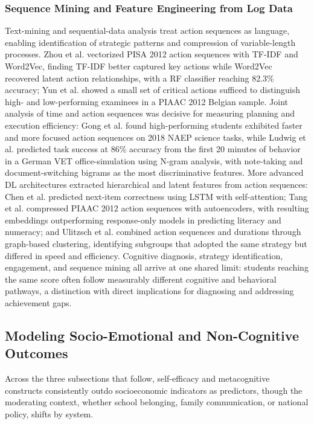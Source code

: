 \documentclass{ieeeaccess}
\begin{document}
\subsubsection{Sequence Mining and Feature Engineering from Log Data}\label{subsubsec4.2.4}

Text-mining and sequential-data analysis treat action sequences as language, enabling identification of strategic patterns and compression of variable-length processes. Zhou et al. \cite{zhou-etal2024} vectorized PISA 2012 action sequences with TF-IDF and Word2Vec, finding TF-IDF better captured key actions while Word2Vec recovered latent action relationships, with a RF classifier reaching 82.3\% accuracy; Yun et al. \cite{yun-etal2025} showed a small set of critical actions sufficed to distinguish high- and low-performing examinees in a PIAAC 2012 Belgian sample. Joint analysis of time and action sequences was decisive for measuring planning and execution efficiency: Gong et al. \cite{gong-etal2023} found high-performing students exhibited faster and more focused action sequences on 2018 NAEP science tasks, while Ludwig et al. \cite{ludwig-etal2024} predicted task success at 86\% accuracy from the first 20 minutes of behavior in a German VET office-simulation using N-gram analysis, with note-taking and document-switching bigrams as the most discriminative features. More advanced DL architectures extracted hierarchical and latent features from action sequences: Chen et al. \cite{chen-etal2023} predicted next-item correctness using LSTM with self-attention; Tang et al. \cite{tang-etal2021} compressed PIAAC 2012 action sequences with autoencoders, with resulting embeddings outperforming response-only models in predicting literacy and numeracy; and Ulitzsch et al. \cite{ulitzsch-etal2021} combined action sequences and durations through graph-based clustering, identifying subgroups that adopted the same strategy but differed in speed and efficiency. Cognitive diagnosis, strategy identification, engagement, and sequence mining all arrive at one shared limit: students reaching the same score often follow measurably different cognitive and behavioral pathways, a distinction with direct implications for diagnosing and addressing achievement gaps.

\subsection{Modeling Socio-Emotional and Non-Cognitive Outcomes}\label{subsec4.3}

Across the three subsections that follow, self-efficacy and metacognitive constructs consistently outdo socioeconomic indicators as predictors, though the moderating context, whether school belonging, family communication, or national policy, shifts by system.
\end{document}
